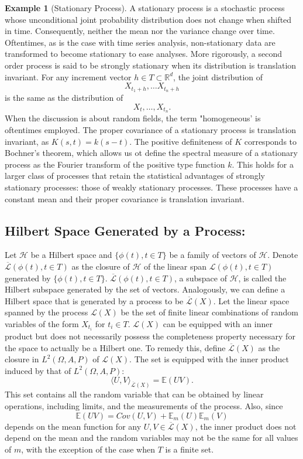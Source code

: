 \documentclass{article}
\theoremstyle{definition}
\newtheorem{exmp}[thm]{Example}
\theoremstyle{remark}
\numberwithin{equation}{section}
\begin{document}
\begin{exmp}[Stationary Process]
A stationary process is a stochastic process whose unconditional joint probability distribution does not change when shifted in time. Consequently, neither the mean nor the variance change over time. Oftentimes, as is the case with time series analysis, non-stationary data are transformed to become stationary to ease analyses. More rigorously, a second order process is said to be strongly stationary when its distribution is translation invariant. For any increment vector $h \in T \subset \mathbb{R}^d$, the joint distribution of 
$$X_{t_1 + h} , \dots X_{t_n + h} $$
is the same as the distribution of 
$$X_t , \dots , X_{t_n}. $$
When the discussion is about random fields, the term "homogeneous' is oftentimes employed. The proper covariance of a stationary process is translation invariant, as $K(s,t) = k(s-t)$. The positive definiteness of $K$ corresponds to Bochner's theorem, which allows us ot define the spectral measure of a stationary process as the Fourier transform of the positive type function $k$. This holds for a larger class of processes that retain the statistical advantages of strongly stationary processes: those of weakly stationary processes. These processes have a constant mean and their proper covariance is translation invariant.
\end{exmp}

\subsection{Hilbert Space Generated by a Process:}
Let $\mathcal{H}$ be a Hilbert space and $\{ \phi (t) , t \in T \}$ be a family of vectors of $\mathcal{H}$. Denote $\overline{\mathcal{L}}(\phi (t), t \in T)$ as the closure of $\mathcal{H}$ of the linear span $\mathcal{L}(\phi (t), t \in T)$ generated by $\{ \phi (t) , t \in T \}$. $\overline{\mathcal{L}}(\phi (t), t \in T)$, a subspace of $\mathcal{H}$, is called the Hilbert subspace generated by the set of vectors. Analogously, we can define a Hilbert space that is generated by a process to be $\overline{\mathcal{L}} (X).$ Let the linear space spanned by the process $\mathcal{L}(X)$ be the set of finite linear combinations of random variables of the form $X_{t_i}$ for $t_i \in T$. $\mathcal{L}(X)$ can be equipped with an inner product but does not necessarily possess the completeness property necessary for the space to actually be a Hilbert one. To remedy this, define $\overline{\mathcal{L}} (X)$ as the closure in $L^2 (\Omega, A, P)$ of $\mathcal{L}(X).$ The set is equipped with the inner product induced by that of $L^2 (\Omega, A, P)$: 
$$\langle U, V \rangle _{\overline{\mathcal{L}} (X)} = \mathbb{E} (UV). $$
This set contains all the random variable that can be obtained by linear operations, including limits, and the measurements of the process. Also, since $$\mathbb{E} (UV) = Cov (U,V) + \mathbb{E}_m (U) \mathbb{E}_m (V)$$
depends on the mean function for any $U, V \in \overline{\mathcal{L}} (X)$, the inner product does not depend on the mean and the random variables may not be the same for all values of $m$, with the exception of the case when $T$ is a finite set. 
\end{document}
